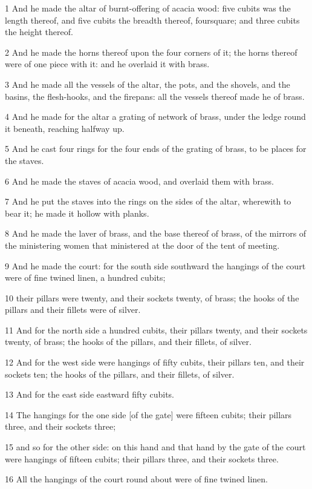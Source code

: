 \par 1 And he made the altar of burnt-offering of acacia wood: five cubits was the length thereof, and five cubits the breadth thereof, foursquare; and three cubits the height thereof.
\par 2 And he made the horns thereof upon the four corners of it; the horns thereof were of one piece with it: and he overlaid it with brass.
\par 3 And he made all the vessels of the altar, the pots, and the shovels, and the basins, the flesh-hooks, and the firepans: all the vessels thereof made he of brass.
\par 4 And he made for the altar a grating of network of brass, under the ledge round it beneath, reaching halfway up.
\par 5 And he cast four rings for the four ends of the grating of brass, to be places for the staves.
\par 6 And he made the staves of acacia wood, and overlaid them with brass.
\par 7 And he put the staves into the rings on the sides of the altar, wherewith to bear it; he made it hollow with planks.
\par 8 And he made the laver of brass, and the base thereof of brass, of the mirrors of the ministering women that ministered at the door of the tent of meeting.
\par 9 And he made the court: for the south side southward the hangings of the court were of fine twined linen, a hundred cubits;
\par 10 their pillars were twenty, and their sockets twenty, of brass; the hooks of the pillars and their fillets were of silver.
\par 11 And for the north side a hundred cubits, their pillars twenty, and their sockets twenty, of brass; the hooks of the pillars, and their fillets, of silver.
\par 12 And for the west side were hangings of fifty cubits, their pillars ten, and their sockets ten; the hooks of the pillars, and their fillets, of silver.
\par 13 And for the east side eastward fifty cubits.
\par 14 The hangings for the one side [of the gate] were fifteen cubits; their pillars three, and their sockets three;
\par 15 and so for the other side: on this hand and that hand by the gate of the court were hangings of fifteen cubits; their pillars three, and their sockets three.
\par 16 All the hangings of the court round about were of fine twined linen.
